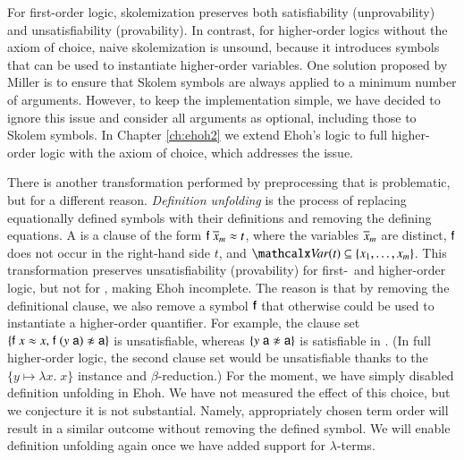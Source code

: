 \begin{rep}
For first-order logic, skolemization preserves both satisfiability
(unprovability) and unsatisfiability (provability). In contrast, for
higher-order logics without the axiom of choice, naive skolemization is
unsound, because it introduces symbols that can be used to instantiate
higher-order variables.
%
One solution proposed by Miller \cite[Sect.~6]{dm-87-compact-proofs} is to ensure that
Skolem symbols are always applied to a minimum number of arguments.
However, to keep the implementation simple, we have decided to
ignore this issue and consider all arguments as optional, including those to
Skolem symbols. In Chapter \ref{ch:ehoh2} we extend Ehoh's logic to full higher-order logic
with the axiom of choice, which addresses the issue.

There is another transformation performed by preprocessing that is
problematic, but for a different reason. \emph{Definition unfolding} is the
process of replacing equationally defined symbols with their definitions and
removing the defining equations. A  is a clause of the form
$\mathsf{f} \; \overline{x}_{m} \approx t$, where the variables $\overline{x}_{m}$ are distinct,
$\mathsf{f}$ does not occur in the right-hand side $t$, and $\Var(t) \subseteq
\{x_1,\dots,x_m\}$.
This transformation preserves unsatisfiability (provability) for first-~and
higher-order logic, but not for \lfhol{}, making Ehoh incomplete. The reason
is that by removing the definitional clause, we also remove a symbol $\mathsf{f}$
that otherwise could be used to instantiate a higher-order quantifier.
For example, the clause set
$\{\cst{f}\;x \eq x{,}\; \cst{f}\;(y\;\cst{a}) \noteq \cst{a}\}$ is unsatisfiable,
whereas $\{y\;\cst{a} \noteq \cst{a}\}$ is satisfiable in \lfhol{}. (In full
higher-order logic, the second clause set would be unsatisfiable thanks to
the $\{y \mapsto \lambda x.\; x\}$ instance and $\beta$-reduction.)
%
For the moment, we have simply disabled definition unfolding in Ehoh. We have
not measured the effect of this choice, but we conjecture it is not substantial.
Namely, appropriately chosen term order will result in a similar outcome without
removing the defined symbol. We will enable definition unfolding again once we
have added support for $\lambda$-terms.


\end{rep}

